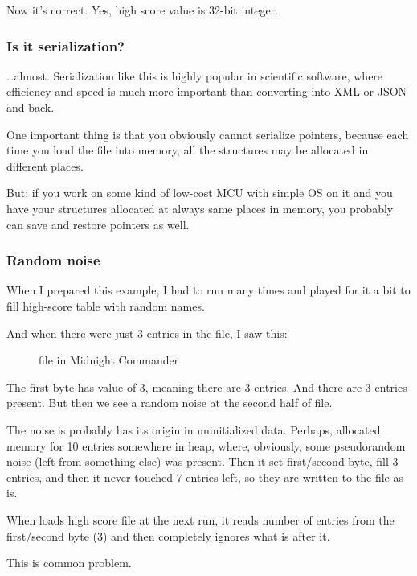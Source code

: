 Now it's correct. Yes, high score value is 32-bit integer.

\subsubsection{Is it serialization?}

\dots almost.
Serialization like this is highly popular in scientific software, where efficiency and speed is much more important
than converting into \ac{XML} or \ac{JSON} and back.

One important thing is that you obviously cannot serialize pointers, because each time you load the file into memory,
all the structures may be allocated in different places.

But: if you work on some kind of low-cost \ac{MCU} with simple \ac{OS} on it
and you have your structures allocated at always same
places in memory, you probably can save and restore pointers as well.

\subsubsection{Random noise}

When I prepared this example, I had to run  many times and played for it a bit
to fill high-score table with random names.

And when there were just 3 entries in the file, I saw this:

\begin{figure}[H]
\centering
{}
\caption{ file in Midnight Commander}
\end{figure}

The first byte has value of 3, meaning there are 3 entries.
And there are 3 entries present.
But then we see a random noise at the second half of file.

The noise is probably has its origin in uninitialized data.
Perhaps,  allocated memory for 10 entries somewhere in heap, where, obviously,
some pseudorandom noise (left from something else) was present.
Then it set first/second byte, fill 3 entries, and then it never touched 7 entries left, so they are written
to the file as is.

When  loads high score file at the next run, it reads number of entries from the first/second byte (3) and
then completely ignores what is after it.

This is common problem.

